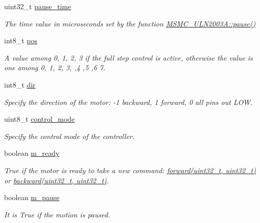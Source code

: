 \begin{DoxyCompactItemize}
uint32\+\_\+t \hyperlink{class_m_s_m_c___u_l_n2003_a_a06987cfacad47f56ec9f3e54cc72ff08}{pause\+\_\+time}
\begin{DoxyCompactList}\small\item\em The time value in microseconds set by the function \hyperlink{class_m_s_m_c___u_l_n2003_a_aa1d3444465d59ca6c87f05f565dde4a2}{M\+S\+M\+C\+\_\+\+U\+L\+N2003\+A\+::pause()} \end{DoxyCompactList}\item 
int8\+\_\+t \hyperlink{class_m_s_m_c___u_l_n2003_a_a8318f5fbce84ff22c9d800e6b637bf52}{pos}
\begin{DoxyCompactList}\small\item\em A value among 0, 1, 2, 3 if the full step control is active, otherwise the value is one among 0, 1, 2, 3, ,4 ,5 ,6 7. \end{DoxyCompactList}\item 
int8\+\_\+t \hyperlink{class_m_s_m_c___u_l_n2003_a_af8b9f054cc60da4bb45567f80c907b94}{dir}
\begin{DoxyCompactList}\small\item\em Specify the direction of the motor\+: -\/1 backward, 1 forward, 0 all pins out L\+O\+W. \end{DoxyCompactList}\item 
uint8\+\_\+t \hyperlink{class_m_s_m_c___u_l_n2003_a_a1da226d2eb7ce293c6378fbe8c80a2ea}{control\+\_\+mode}
\begin{DoxyCompactList}\small\item\em Specify the control mode of the controller. \end{DoxyCompactList}\item 
boolean \hyperlink{class_m_s_m_c___u_l_n2003_a_a4f2ee51f769815847a2a0062ff03bd6e}{m\+\_\+ready}
\begin{DoxyCompactList}\small\item\em True if the motor is ready to take a new command\+: \hyperlink{class_m_s_m_c___u_l_n2003_a_a9657492f948a75472b311bc0b823899f}{forward(uint32\+\_\+t, uint32\+\_\+t)} or \hyperlink{class_m_s_m_c___u_l_n2003_a_ac46e6ec6345f95b534079bcf2920885e}{backward(uint32\+\_\+t, uint32\+\_\+t)}. \end{DoxyCompactList}\item 
boolean \hyperlink{class_m_s_m_c___u_l_n2003_a_a6b0ddbdadf767fdc1d1c5f8a3ffd6f10}{m\+\_\+pause}
\begin{DoxyCompactList}\small\item\em It is True if the motion is paused. \end{DoxyCompactList}\end{DoxyCompactItemize}


